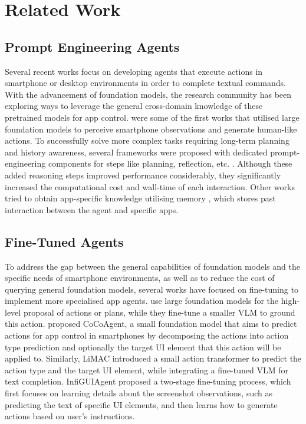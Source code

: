 \section{Related Work}
\subsection{Prompt Engineering Agents}

Several recent works focus on developing agents that execute actions in smartphone or desktop environments in order to complete textual commands. With the advancement of foundation models, the research community has been exploring ways to leverage the general cross-domain knowledge of these pretrained models for app control. \citet{appagent,mobileagent} were some of the first works that utilised large foundation models to perceive smartphone observations and generate human-like actions. To successfully solve more complex tasks requiring long-term planning and history awareness, several frameworks were proposed with dedicated prompt-engineering components for steps like planning, reflection, etc. \citep{mobileagentv2, wang2024oscar, song2024mmac}. Although these added reasoning steps improved performance considerably, they significantly increased the computational cost and wall-time of each interaction. 
Other works tried to obtain app-specific knowledge utilising memory \citep{autodroid, lee2024mobilegpt}, which stores past interaction between the agent and specific apps.

\subsection{Fine-Tuned Agents}

To address the gap between the general capabilities of foundation models and the specific needs of smartphone environments, as well as to reduce the cost of querying general foundation models, several works have focused on fine-tuning to implement more specialised app agents. \citet{wang2024ponder,gou2024navigating} use large foundation models for the high-level proposal of actions or plans, while they fine-tune a smaller VLM to ground this action. \citet{ma2024comprehensive} proposed CoCoAgent, a small foundation model that aims to predict actions for app control in smartphones by decomposing the actions into action type prediction and optionally the target UI element that this action will be applied to.
Similarly, LiMAC \citep{christianos2024lightweight} introduced a small action transformer to predict the action type and the target UI element, while integrating a fine-tuned VLM for text completion. 
InfiGUIAgent \citep{liu2025infiguiagent} proposed a two-stage fine-tuning process, which first focuses on learning details about the screenshot observations, such as predicting the text of specific UI elements, and then learns how to generate actions based on user's instructions. 

